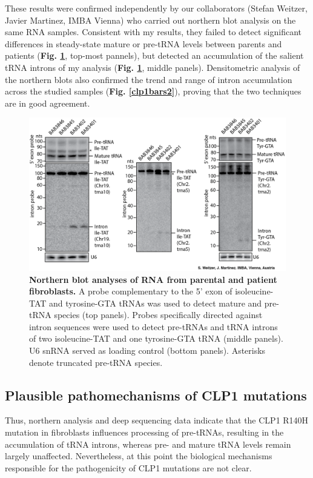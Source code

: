 \documentclass[12pt]{rockefeller}
\begin{document}
These results were confirmed independently by our collaborators (Stefan Weitzer, Javier Martinez, IMBA Vienna) who carried out northern blot analysis on the same RNA samples. Consistent with my results, they failed to detect significant differences in steady-state mature or pre-tRNA levels between parents and patients (\textbf{Fig. \ref{nb}}, top-most pannels), but detected an accumulation of the salient tRNA introns of my analysis (\textbf{Fig. \ref{nb}}, middle panels). Densitometric analysis of the northern blots also confirmed the trend and range of intron accumulation across the studied samples (\textbf{Fig. \ref{clp1bars2}}), proving that the two techniques are in good agreement. 

\begin{figure}[!ht]%
\centering
\includegraphics[width=\textwidth]{nb.png}%
\caption[Northern blot analyses of RNA from parental and patient fibroblasts.]
{\textbf{Northern blot analyses of RNA from parental and patient fibroblasts.}
A probe complementary to the 5' exon of isoleucine-TAT and tyrosine-GTA tRNAs was used to detect mature and pre-tRNA species (top panels). Probes specifically directed against intron sequences were used to detect pre-tRNAs and tRNA introns of two isoleucine-TAT and one tyrosine-GTA tRNA (middle panels). U6 snRNA served as loading control (bottom panels). Asterisks denote truncated pre-tRNA species.}
\centering
\label{nb}%
\end{figure}

\subsection{Plausible pathomechanisms of CLP1 mutations}\label{clp1_evolution}
Thus, northern analysis and deep sequencing data indicate that the CLP1 R140H mutation in fibroblasts influences processing of pre-tRNAs, resulting in the accumulation of tRNA introns, whereas pre- and mature tRNA levels remain largely unaffected. Nevertheless, at this point the biological mechanisms responsible for the pathogenicity of CLP1 mutations are not clear.
\end{document}
